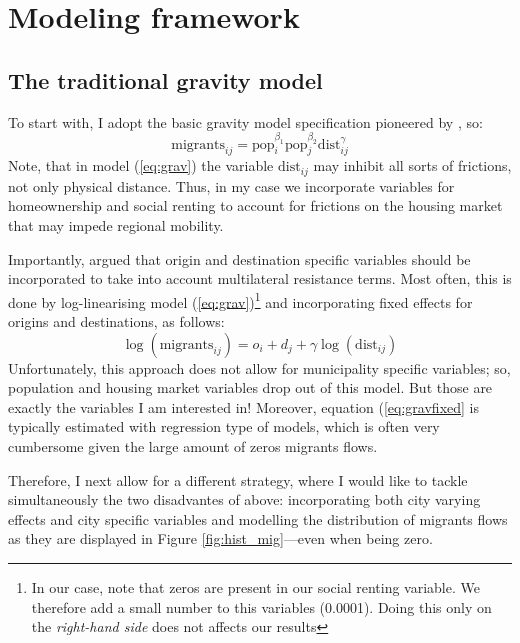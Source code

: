 \documentclass[fleqn,10pt]{SelfArx} %
\begin{document}
        \section{Modeling framework}

        \subsection{The traditional gravity model}

        To start with, I adopt the basic gravity model specification pioneered by
        \citet{tinbergen1962shaping}, so:
        \begin{equation}
          \text{migrants}_{ij} = \text{pop}_i^{\beta_1}\text{pop}_j^{\beta_2}\text{dist}_{ij}^\gamma
          \label{eq:grav}
        \end{equation}
        Note, that in model (\ref{eq:grav}) the variable
        $\text{dist}_{ij}$ may inhibit all sorts of frictions, not
        only physical distance. Thus, in my case we incorporate
        variables for homeownership and social renting to account for
        frictions on the housing market that may impede regional
        mobility.

        Importantly, \citet{anderson2003gravity} argued that origin
        and destination specific variables should be incorporated to
        take into account multilateral resistance terms. Most often,
        this is done by log-linearising model
        (\ref{eq:grav})\footnote{In our case, note that zeros are
          present in our social renting variable. We therefore add a
          small number to this variables (0.0001). Doing this only on
          the \emph{right-hand side} does not affects our results} and
        incorporating fixed effects for origins and destinations, as
        follows:
        \begin{equation}
          \log(\text{migrants}_{ij}) = o_i + d_j +  \gamma\log(\text{dist}_{ij})
          \label{eq:gravfixed}
        \end{equation} 
        Unfortunately, this approach does not allow for municipality
        specific variables; so, population and housing market
        variables drop out of this model. But those are exactly the
        variables I am  interested in! Moreover, equation
        (\ref{eq:gravfixed} is typically estimated with regression
        type of models, which is often very cumbersome given the large
        amount of zeros migrants flows.

        Therefore, I next allow for a different strategy, where I
        would like to tackle simultaneously the two disadvantes of above:
        incorporating both city varying effects and city specific variables and
        modelling the distribution of migrants flows as they are
        displayed in Figure \ref{fig:hist_mig}---even when being zero.
\end{document}
